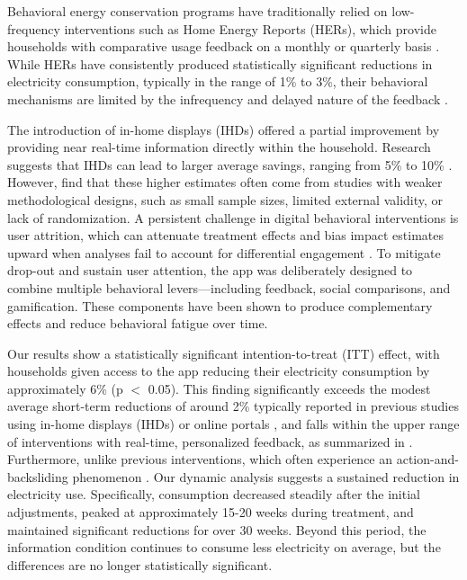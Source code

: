 Behavioral energy conservation programs have traditionally relied on low-frequency interventions such as Home Energy Reports (HERs), which provide households with comparative usage feedback on a monthly or quarterly basis \citep{allcottSocialNormsEnergy2011}. While HERs have consistently produced statistically significant reductions in electricity consumption, typically in the range of 1\% to 3\%, their behavioral mechanisms are limited by the infrequency and delayed nature of the feedback \citep{allcottShortrunLongrunEffects2014, costaEnergyConservationNudges2013}.

The introduction of in-home displays (IHDs) offered a partial improvement by providing near real-time information directly within the household. Research suggests that IHDs can lead to larger average savings, ranging from 5\% to 10\% \citep{fischerFeedbackHouseholdElectricity2008,khannaMulticountryMetaanalysisRole2021}. However, \citet{khannaMulticountryMetaanalysisRole2021} find that these higher estimates often come from studies with weaker methodological designs, such as small sample sizes, limited external validity, or lack of randomization. A persistent challenge in digital behavioral interventions is user attrition, which can attenuate treatment effects and bias impact estimates upward when analyses fail to account for differential engagement \citep{delmasInformationStrategiesEnergy2013}. To mitigate drop-out and sustain user attention, the app was deliberately designed to combine multiple behavioral levers—including feedback, social comparisons, and gamification. These components have been shown to produce complementary effects \citep{khannaMulticountryMetaanalysisRole2021} and reduce behavioral fatigue over time. 

Our results show a statistically significant intention-to-treat (ITT) effect, with households given access to the app reducing their electricity consumption by approximately 6\% (p $<$ 0.05). This finding significantly exceeds the modest average short-term reductions of around 2\% typically reported in previous studies using in-home displays (IHDs) or online portals \citep{buchananQuestionEnergyReduction2015}, and falls within the upper range of interventions with real-time, personalized feedback, as summarized in \citet{khannaMulticountryMetaanalysisRole2021}. Furthermore, unlike previous interventions, which often experience an action-and-backsliding phenomenon \citep{allcottShortrunLongrunEffects2014,buchananQuestionEnergyReduction2015}. Our dynamic analysis suggests a sustained reduction in electricity use. Specifically, consumption decreased steadily after the initial adjustments, peaked at approximately 15-20 weeks during treatment, and maintained significant reductions for over 30 weeks.  Beyond this period, the information condition continues to consume less electricity on average, but the differences are no longer statistically significant.

